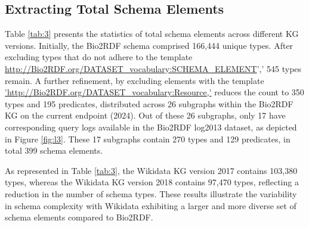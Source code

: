 \documentclass[sw]{iosart2x}
\begin{document}
\subsection{Extracting Total Schema Elements}
Table \ref{tab:3} presents the statistics of total schema elements across different KG versions. Initially, the Bio2RDF schema comprised 166,444 unique types. After excluding types that do not adhere to the template \url{http://Bio2RDF.org/DATASET_vocabulary:SCHEMA_ELEMENT}',' 545 types remain. A further refinement, by excluding elements with the template \url{'http://Bio2RDF.org/DATASET_vocabulary:Resource,'} reduces the count to 350 types and 195 predicates, distributed across 26 subgraphs within the Bio2RDF KG on the current endpoint (2024). Out of these 26 subgraphs, only 17 have corresponding query logs available in the Bio2RDF log2013 dataset, as depicted in Figure \ref{fig:l3}. These 17 subgraphs contain 270 types and 129 predicates, in total 399 schema elements.

As represented in Table \ref{tab:3}, the Wikidata KG version 2017 contains 103,380 types, whereas the Wikidata KG version 2018 contains 97,470 types, reflecting a reduction in the number of schema types. These results illustrate the variability in schema complexity with Wikidata exhibiting a larger and more diverse set of schema elements compared to Bio2RDF.
\begin{table}[ht]
\centering
\caption{Total schema elements Statistics per KG version}
\label{tab:3}
\end{table}
\end{document}
